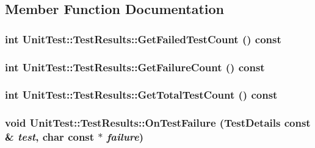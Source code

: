 \subsection{Member Function Documentation}
\hypertarget{class_unit_test_1_1_test_results_b1a492236db33a8a00a1c0048bbe32de}{
\subsubsection[{GetFailedTestCount}]{\setlength{\rightskip}{0pt plus 5cm}int UnitTest::TestResults::GetFailedTestCount () const}}
\label{class_unit_test_1_1_test_results_b1a492236db33a8a00a1c0048bbe32de}


\hypertarget{class_unit_test_1_1_test_results_008043809cf05629adf8bbeb1492a821}{
\subsubsection[{GetFailureCount}]{\setlength{\rightskip}{0pt plus 5cm}int UnitTest::TestResults::GetFailureCount () const}}
\label{class_unit_test_1_1_test_results_008043809cf05629adf8bbeb1492a821}


\hypertarget{class_unit_test_1_1_test_results_01c7d08d38520aabddbb31acccaf6269}{
\subsubsection[{GetTotalTestCount}]{\setlength{\rightskip}{0pt plus 5cm}int UnitTest::TestResults::GetTotalTestCount () const}}
\label{class_unit_test_1_1_test_results_01c7d08d38520aabddbb31acccaf6269}


\hypertarget{class_unit_test_1_1_test_results_37dbb0baa9ba978238a4ba7c2a89b53c}{
\subsubsection[{OnTestFailure}]{\setlength{\rightskip}{0pt plus 5cm}void UnitTest::TestResults::OnTestFailure ({\bf TestDetails} const \& {\em test}, \/  char const $\ast$ {\em failure})}}
\label{class_unit_test_1_1_test_results_37dbb0baa9ba978238a4ba7c2a89b53c}


